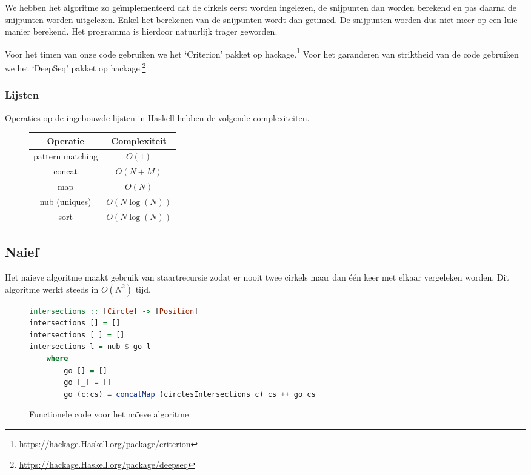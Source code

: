 We hebben het algoritme zo ge\"implementeerd dat de cirkels eerst
worden ingelezen, de snijpunten dan worden berekend en pas daarna de
snijpunten worden uitgelezen. Enkel het berekenen van de snijpunten
wordt dan getimed. De snijpunten worden dus niet meer op een luie
manier berekend. Het programma is hierdoor natuurlijk trager geworden.

Voor het timen van onze code gebruiken we het `Criterion' pakket op hackage.\footnote{\url{https://hackage.Haskell.org/package/criterion}}
Voor het garanderen van striktheid van de code gebruiken we het `DeepSeq' pakket op hackage.\footnote{\url{https://hackage.Haskell.org/package/deepseq}}

\subsubsection{Lijsten}
Operaties op de ingebouwde lijsten in Haskell hebben de volgende complexiteiten.
\begin{figure}[H]
\centering
\begin{tabular}{|c|c|}
\hline
Operatie & Complexiteit\\
\hline\hline
pattern matching & $O(1)$\\\hline
concat & $O(N+M)$\\\hline
map & $O(N)$\\\hline
nub (uniques) & $O(N\log(N))$\\\hline
sort & $O(N\log(N))$\\\hline
\end{tabular}
\end{figure}

\newpage
\subsection{Naief}
Het naieve algoritme maakt gebruik van staartrecursie zodat er nooit twee cirkels maar dan \'e\'en keer met elkaar vergeleken worden. Dit algoritme werkt steeds in $O(N^2)$ tijd.

\begin{figure}[H]
\begin{lstlisting}[language=haskell]
intersections :: [Circle] -> [Position]
intersections [] = []
intersections [_] = []
intersections l = nub $ go l
    where
        go [] = []
        go [_] = []
        go (c:cs) = concatMap (circlesIntersections c) cs ++ go cs
\end{lstlisting}
\label{imp:naive}
\caption{Functionele code voor het na\"ieve algoritme}
\end{figure}


